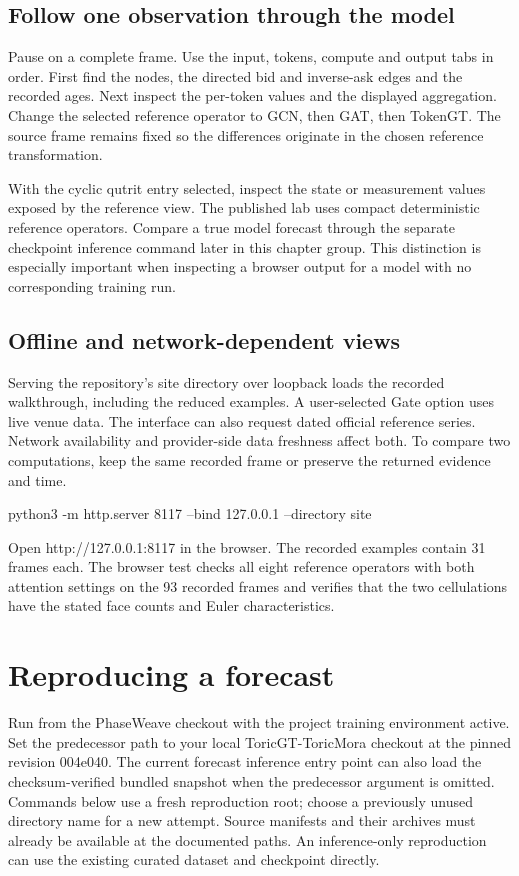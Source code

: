 \documentclass[11pt,oneside,openany]{book}
\begin{document}
\section*{Follow one observation through the model}
Pause on a complete frame. Use the input, tokens, compute and output tabs in order. First find the nodes, the directed bid and inverse-ask edges and the recorded ages. Next inspect the per-token values and the displayed aggregation. Change the selected reference operator to GCN, then GAT, then TokenGT. The source frame remains fixed so the differences originate in the chosen reference transformation.

With the cyclic qutrit entry selected, inspect the state or measurement values exposed by the reference view. The published lab uses compact deterministic reference operators. Compare a true model forecast through the separate checkpoint inference command later in this chapter group. This distinction is especially important when inspecting a browser output for a model with no corresponding training run.

\section*{Offline and network-dependent views}
Serving the repository's site directory over loopback loads the recorded walkthrough, including the reduced examples. A user-selected Gate option uses live venue data. The interface can also request dated official reference series. Network availability and provider-side data freshness affect both. To compare two computations, keep the same recorded frame or preserve the returned evidence and time.

\begin{BookCode}
python3 -m http.server 8117 --bind 127.0.0.1 --directory site
\end{BookCode}
Open http://127.0.0.1:8117 in the browser. The recorded examples contain 31 frames each. The browser test checks all eight reference operators with both attention settings on the 93 recorded frames and verifies that the two cellulations have the stated face counts and Euler characteristics.

\chapter{Reproducing a forecast}
Run from the PhaseWeave checkout with the project training environment active. Set the predecessor path to your local ToricGT-ToricMora checkout at the pinned revision 004e040. The current forecast inference entry point can also load the checksum-verified bundled snapshot when the predecessor argument is omitted. Commands below use a fresh reproduction root; choose a previously unused directory name for a new attempt. Source manifests and their archives must already be available at the documented paths. An inference-only reproduction can use the existing curated dataset and checkpoint directly.
\end{document}
